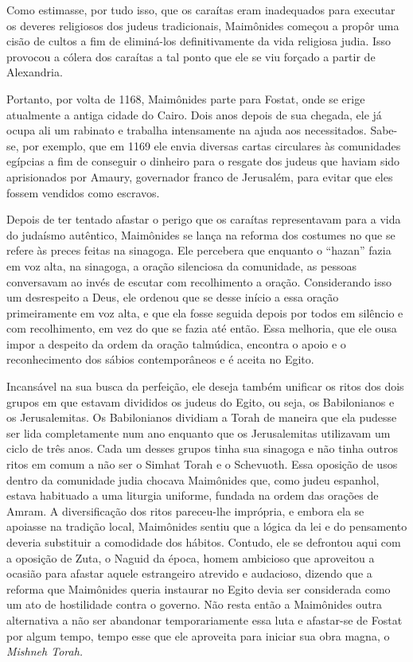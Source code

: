 Como estimasse, por tudo isso, que os caraítas eram inadequados para
executar os deveres religiosos dos judeus tradicionais, Maimônides
come­çou a propôr uma cisão de cultos a fim de eliminá-los
definitivamente da vida religiosa judia. Isso provocou a cólera dos
caraítas a tal ponto que ele se viu forçado a partir de Alexandria.

Portanto, por volta de 1168, Maimônides parte para Fostat, onde se erige
atualmente a antiga cidade do Cairo. Dois anos depois de sua chegada,
ele já ocupa ali um rabinato e trabalha intensamente na ajuda aos
necessitados. Sabe-se, por exemplo, que em 1169 ele envia diversas
cartas circulares às co­munidades egípcias a fim de conseguir o dinheiro
para o resgate dos judeus que haviam sido aprisionados por Amaury,
governador franco de Jerusalém, para evitar que eles fossem vendidos
como escravos.

Depois de ter tentado afastar o perigo que os caraítas representavam
para a vida do judaísmo autêntico, Maimônides se lança na reforma dos
costu­mes no que se refere às preces feitas na sinagoga. Ele percebera
que enquanto o ``hazan'' fazia em voz alta, na sinagoga, a oração
silenciosa da comunidade, as pessoas conversavam ao invés de escutar com
recolhimento a oração. Con­siderando isso um desrespeito a Deus, ele
ordenou que se desse início a essa oração primeiramente em voz alta, e
que ela fosse seguida depois por todos em silêncio e com recolhimento,
em vez do que se fazia até então. Essa melho­ria, que ele ousa impor a
despeito da ordem da oração talmúdica, encontra o apoio e o
reconhecimento dos sábios contemporâneos e é aceita no Egito.

Incansável na sua busca da perfeição, ele deseja também unificar os
ritos dos dois grupos em que estavam divididos os judeus do Egito, ou
seja, os Babilonianos e os Jerusalemitas. Os Babilonianos dividiam a
Torah de ma­neira que ela pudesse ser lida completamente num ano
enquanto que os Jerusa­lemitas utilizavam um ciclo de três anos. Cada um
desses grupos tinha sua sina­goga e não tinha outros ritos em comum a
não ser o Simhat Torah e o Sche­vuoth. Essa oposição de usos dentro da
comunidade judia chocava Maimôni­des que, como judeu espanhol, estava
habituado a uma liturgia uniforme, fun­dada na ordem das orações de
Amram. A diversificação dos ritos pareceu-lhe imprópria, e embora ela se
apoiasse na tradição local, Maimônides sentiu que a lógica da lei e do
pensamento deveria substituir a comodidade dos hábitos. Contudo, ele se
defrontou aqui com a oposição de Zuta, o Naguid da época, homem
ambicioso que aproveitou a ocasião para afastar aquele estrangeiro
atre­vido e audacioso, dizendo que a reforma que Maimônides queria
instaurar no Egito devia ser considerada como um ato de hostilidade
contra o governo. Não resta então a Maimônides outra alternativa a não
ser abandonar temporariamente essa luta e afastar-se de Fostat por algum
tempo, tempo esse que ele aproveita para iniciar sua obra magna, o
\emph{Mishneh Torah.}

